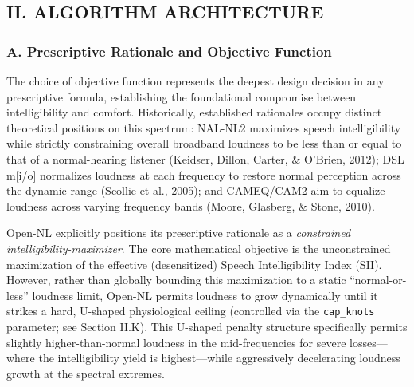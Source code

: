 \documentclass[
  12pt,
]{article}
\begin{document}
\subsection{II. ALGORITHM
ARCHITECTURE}\label{ii.-algorithm-architecture}

\subsubsection{A. Prescriptive Rationale and Objective
Function}\label{a.-prescriptive-rationale-and-objective-function}

The choice of objective function represents the deepest design decision
in any prescriptive formula, establishing the foundational compromise
between intelligibility and comfort. Historically, established
rationales occupy distinct theoretical positions on this spectrum:
NAL-NL2 maximizes speech intelligibility while strictly constraining
overall broadband loudness to be less than or equal to that of a
normal-hearing listener (Keidser, Dillon, Carter, \& O'Brien, 2012); DSL
m{[}i/o{]} normalizes loudness at each frequency to restore normal
perception across the dynamic range (Scollie et al., 2005); and
CAMEQ/CAM2 aim to equalize loudness across varying frequency bands
(Moore, Glasberg, \& Stone, 2010).

Open-NL explicitly positions its prescriptive rationale as a
\emph{constrained intelligibility-maximizer}. The core mathematical
objective is the unconstrained maximization of the effective
(desensitized) Speech Intelligibility Index (SII). However, rather than
globally bounding this maximization to a static ``normal-or-less''
loudness limit, Open-NL permits loudness to grow dynamically until it
strikes a hard, U-shaped physiological ceiling (controlled via the
\texttt{cap\_knots} parameter; see Section II.K). This U-shaped penalty
structure specifically permits slightly higher-than-normal loudness in
the mid-frequencies for severe losses---where the intelligibility yield
is highest---while aggressively decelerating loudness growth at the
spectral extremes.
\end{document}
